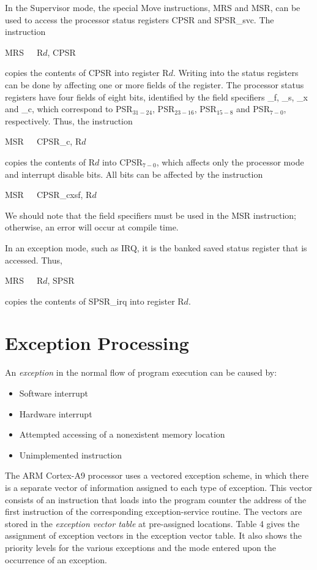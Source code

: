 \documentclass[11pt, twoside, pdftex]{article}
\begin{document}
In the Supervisor mode, the special Move instructions, MRS and
MSR, can be used to access the processor status registers CPSR
and SPSR\_svc.
The instruction
\begin{center}
MRS~~~R$d$, CPSR
\end{center}
\noindent
copies the contents of CPSR into register R$d$. Writing into
the status registers can be done by affecting one or more fields
of the register. The processor status registers have four fields of eight bits, identified by the field specifiers \_f, \_s, \_x and \_c, which correspond to PSR$_{31-24}$, PSR$_{23-16}$,
PSR$_{15-8}$ and PSR$_{7-0}$, respectively. Thus, the instruction
\begin{center}
MSR~~~CPSR\_c, R$d$
\end{center}
\noindent
copies the contents of R$d$ into CPSR$_{7-0}$, which affects only the processor mode and interrupt disable bits. All bits can be affected by the instruction
\begin{center}
MSR~~~CPSR\_cxsf, R$d$
\end{center}
\noindent
We should note that the field specifiers must be used in the
MSR instruction; otherwise, an error will occur at compile
time.

In an exception mode, such as IRQ, it is the banked saved
status register that is accessed. Thus,
\begin{center}
MRS~~~R$d$, SPSR
\end{center}
\noindent
copies the contents of SPSR\_irq into register R$d$.

\section{Exception Processing}

An {\it exception} in the normal flow of program execution can be caused by:
\begin{itemize}
\item Software interrupt
\item Hardware interrupt
\item Attempted accessing of a nonexistent memory location
\item Unimplemented instruction
\end{itemize}
\noindent
The ARM Cortex-A9 processor uses a vectored exception scheme, in
which there is a separate vector of information assigned to each
type of exception. This vector consists of an instruction
that loads into the program counter the address of the first
instruction of the corresponding exception-service routine. 
The vectors are stored 
in the {\it exception vector table} at pre-assigned locations.
Table 4 gives the assignment of exception vectors in the
exception vector table. It also shows the priority levels
for the various exceptions and the mode entered upon the
occurrence of an exception.
\end{document}
